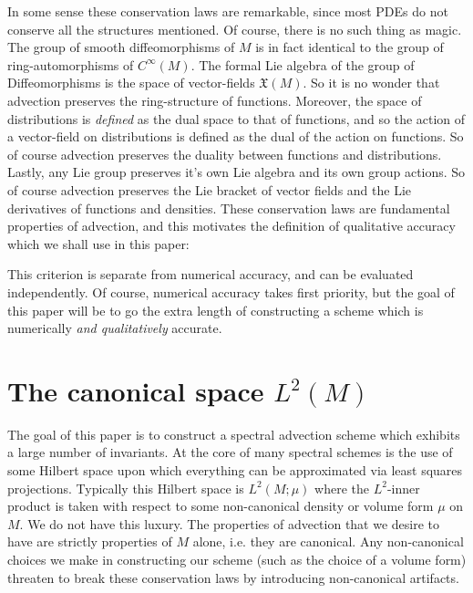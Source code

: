 \documentclass[12pt]{amsart}
\begin{document}
In some sense these conservation laws are remarkable, since most PDEs do not conserve all the structures mentioned.
Of course, there is no such thing as magic.
The group of smooth diffeomorphisms of $M$ is in fact identical to the group of ring-automorphisms of $C^{\infty}(M)$.
The formal Lie algebra of the group of Diffeomorphisms is the space of vector-fields $\mathfrak{X}(M)$.
So it is no wonder that advection preserves the ring-structure of functions.
Moreover, the space of distributions is \emph{defined} as the dual space to that of functions, and so the action of a vector-field on distributions is defined
as the dual of the action on functions.
So of course advection preserves the duality between functions and distributions.
Lastly, any Lie group preserves it's own Lie algebra and its own group actions.
So of course advection preserves the Lie bracket of vector fields and the Lie derivatives of functions and densities.
These conservation laws are fundamental properties of advection, and this motivates the definition of qualitative accuracy
which we shall use in this paper:

\begin{center}
\end{center}

This criterion is separate from numerical accuracy, and can be evaluated independently.
Of course, numerical accuracy takes first priority,
but the goal of this paper will be to go the extra length of constructing a scheme which is numerically
\emph{and qualitatively} accurate.

\section{The canonical space $L^{2}(M)$}
\label{sec:half densities}
The goal of this paper is to construct a spectral advection scheme which exhibits a large number of invariants.
At the core of many spectral schemes is the use of some Hilbert space upon which everything can be approximated via least squares projections.
Typically this Hilbert space is $L^{2}(M ; \mu)$ where the $L^{2}$-inner product is taken with respect to some non-canonical density or volume form $\mu$ on $M$.
We do not have this luxury.
The properties of advection that we desire to have are strictly properties of $M$ alone, i.e. they are canonical.
Any non-canonical choices we make in constructing our scheme (such as the choice of a volume form) threaten to break these conservation laws by introducing non-canonical artifacts.
\end{document}
